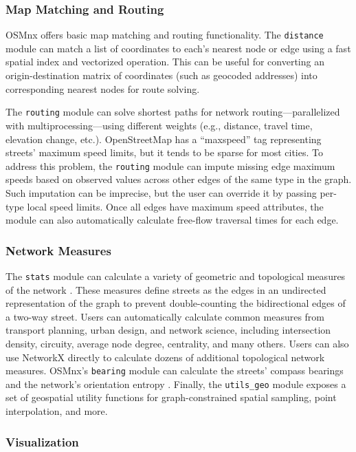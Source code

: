 \documentclass[12pt,letterpaper]{article} %
\begin{document}
\subsubsection{Map Matching and Routing}

OSMnx offers basic map matching and routing functionality. The \texttt{distance} module can match a list of coordinates to each's nearest node or edge using a fast spatial index and vectorized operation. This can be useful for converting an origin-destination matrix of coordinates (such as geocoded addresses) into corresponding nearest nodes for route solving.

The \texttt{routing} module can solve shortest paths for network routing---parallelized with multiprocessing---using different weights (e.g., distance, travel time, elevation change, etc.). OpenStreetMap has a \enquote{maxspeed} tag representing streets' maximum speed limits, but it tends to be sparse for most cities. To address this problem, the \texttt{routing} module can impute missing edge maximum speeds based on observed values across other edges of the same type in the graph. Such imputation can be imprecise, but the user can override it by passing per-type local speed limits. Once all edges have maximum speed attributes, the module can also automatically calculate free-flow traversal times for each edge.

\subsubsection{Network Measures}

The \texttt{stats} module can calculate a variety of geometric and topological measures of the network \citep{boeing_street_2022}. These measures define streets as the edges in an undirected representation of the graph to prevent double-counting the bidirectional edges of a two-way street. Users can automatically calculate common measures from transport planning, urban design, and network science, including intersection density, circuity, average node degree, centrality, and many others. Users can also use NetworkX directly to calculate dozens of additional topological network measures. OSMnx's \texttt{bearing} module can calculate the streets' compass bearings and the network's orientation entropy \citep{boeing_urban_2019}. Finally, the \texttt{utils\_geo} module exposes a set of geospatial utility functions for graph-constrained spatial sampling, point interpolation, and more.

\subsubsection{Visualization}
\end{document}
